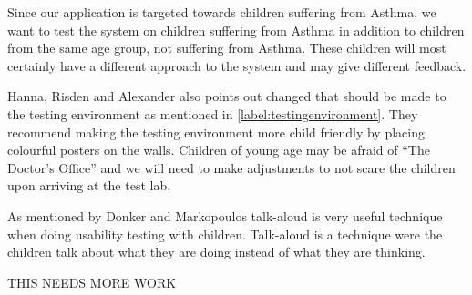 Since our application is targeted towards children suffering from Asthma, we want to test the system on children suffering from Asthma in addition to children from the same age group, not suffering from Asthma. These children will most certainly have a different approach to the system and may give different feedback.

Hanna, Risden and Alexander also points out changed that should be made to the testing environment as mentioned in \ref{label:testingenvironment}. They recommend making the testing environment more child friendly by placing colourful posters on the walls.
Children of young age may be afraid of ``The Doctor's Office'' and we will need to make adjustments to not scare the children upon arriving at the test lab. 

As mentioned by Donker and Markopoulos \cite{TalkAloud} talk-aloud is very useful technique when doing usability testing with children. Talk-aloud is a technique were the children talk about what they are doing instead of what they are thinking.

THIS NEEDS MORE WORK

